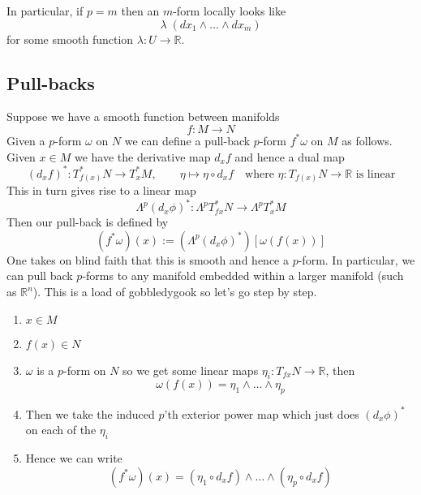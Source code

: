 \documentclass[11pt]{article}
\newcommand{\defeq}{:=}
\newcommand{\Lp}{\Lambda^p}
\newcommand{\R}{\mathbb{R}}
\newcommand{\mdf}[1]{{\color{Green} #1}}
\begin{document}
In particular, if $p=m$ then an $m$-form locally looks like
\[
	\lambda \; (dx_1 \wedge \dots \wedge dx_m)
\]
for some smooth function $\lambda: U \to \R$.

\subsection{Pull-backs}
Suppose we have a smooth function between manifolds
\[
f:M \to N
\]
Given a $p$-form $\omega$ on $N$ we can define a \mdf{pull-back $p$-form $f^\ast\omega$} on $M$ as follows. 
Given $x\in M$ we have the derivative map $d_xf$ and hence a dual map
\[
	(d_x f)^\ast : T^\ast_{f(x)}N \to T^\ast_x M , \quad \quad \eta \mapsto \eta \circ d_xf \quad \text{where }\eta:T_{f(x)}N \to \R\text{ is linear}
\]
This in turn gives rise to a linear map
\[
	\Lp(d_x\phi)^\ast : \Lambda^pT_{fx}^\ast N \to \Lp T_x^\ast M
\]
Then our pull-back is defined by
\[
	(f^\ast\omega)(x) \defeq (\Lp(d_x\phi)^\ast)\left[\omega(f(x))\right]
\]
One takes on blind faith that this is smooth and hence a $p$-form.
In particular, we can pull back $p$-forms to any manifold embedded within a larger manifold (such as $\R^n$).
This is a load of gobbledygook so let's go step by step.
\begin{enumerate}
	\item $x\in M$
	\item $f(x)\in N$
	\item $\omega$ is a $p$-form on $N$ so we get some linear maps $\eta_i:T_{fx}N\to\R$, then
		\[
			\omega(f(x))=\eta_1 \wedge \dots \wedge \eta_p
		\]
	\item Then we take the induced $p$'th exterior power map which just does $(d_x\phi)^\ast$ on each of the $\eta_i$
	\item Hence we can write
		\[
			(f^\ast\omega)(x) = (\eta_1 \circ d_xf) \wedge \dots \wedge (\eta_p \circ d_xf)
		\]
\end{enumerate}
\end{document}
